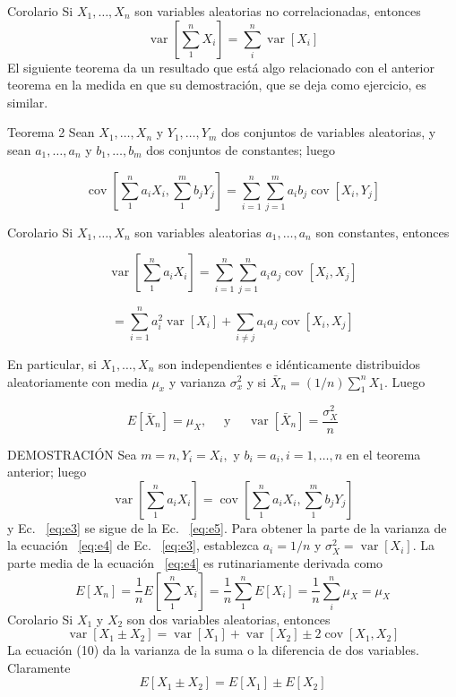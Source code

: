 Corolario Si $X_{1}, \ldots, X_{n}$ son variables aleatorias no correlacionadas, entonces
$$
\operatorname{var}\left[\sum_{1}^{n} X_{i}\right]=\sum_{i}^{n} \operatorname{var}\left[X_{i}\right]
$$
El siguiente teorema da un resultado que está algo relacionado con el anterior teorema en la medida en que su demostración, que se deja como ejercicio, es similar.

Teorema 2 Sean $X_{1}, \ldots, X_{n}$ y $Y_{1}, \ldots, Y_{m}$ dos conjuntos de variables aleatorias, y sean $a_{1}, \ldots, a_{n}$ y $b_{1}, \ldots, b_{m}$ dos conjuntos de constantes; luego

\begin{equation}\label{eq:e5}
\operatorname{cov}\left[\sum_{1}^{n} a_{i} X_{i}, \sum_{1}^{m} b_{j} Y_{j}\right]=\sum_{i=1}^{n} \sum_{j=1}^{m} a_{i} b_{j} \operatorname{cov}\left[X_{i}, Y_{j}\right]
\end{equation}

Corolario Si $X_{1}, \ldots, X_{n}$ son variables aleatorias $a_{1}, \ldots, a_{n}$ son constantes, entonces

$$\operatorname{var}\left[\sum_{1}^{n} a_{i} X_{i}\right]= \sum_{i=1}^{n} \sum_{j=1}^{n} a_{i} a_{j} \operatorname{cov}\left[X_{i}, X_{j}\right]$$

\begin{equation}\label{eq:e3}
=\sum_{i=1}^{n} a_{i}^{2} \operatorname{var}\left[X_{i}\right]+\sum_{i \neq j} a_{i} a_{j} \operatorname{cov}\left[X_{i}, X_{j}\right]
\end{equation}

En particular, si $X_{1}, \ldots, X_{n}$ son independientes e idénticamente distribuidos aleatoriamente con media $\mu_{x}$ y varianza $\sigma_{x}^{2}$ y si $\bar{X}_{n}=(1 / n) \sum_{1}^{n} X_{1}$. Luego

\begin{equation}\label{eq:e4}
E\left[\bar{X}_{n}\right]=\mu_{X}, \quad \text { y } \quad \operatorname{var}\left[\bar{X}_{n}\right]=\frac{\sigma_{X}^{2}}{n}
\end{equation}

DEMOSTRACIÓN Sea $m=n, Y_{i}=X_{i},$ y $b_{i}=a_{i}, i=1, \ldots, n$ en el teorema anterior; luego
$$
\operatorname{var}\left[\sum_{1}^{n} a_{i} X_{i}\right]=\operatorname{cov}\left[\sum_{1}^{n} a_{i} X_{i}, \sum_{1}^{m} b_{j} Y_{j}\right]
$$
y Ec. ~\ref{eq:e3} se sigue de la Ec. ~\ref{eq:e5}. Para obtener la parte de la varianza de la ecuación ~\ref{eq:e4} de Ec. ~\ref{eq:e3}, establezca $a_{i}=1 / n$ y $\sigma_{X}^{2}=\operatorname{var}\left[X_{i}\right] .$ La parte media de la ecuación ~\ref{eq:e4} es rutinariamente derivada como
$$
E\left[X_{n}\right]=\frac{1}{n} E\left[\sum_{1}^{n} X_{i}\right]=\frac{1}{n} \sum_{1}^{n} E\left[X_{i}\right]=\frac{1}{n} \sum_{i}^{n} \mu_{X}=\mu_{X}
$$
Corolario Si $X_{1}$ y $X_{2}$ son dos variables aleatorias, entonces
$$
\operatorname{var}\left[X_{1} \pm X_{2}\right]=\operatorname{var}\left[X_{1}\right]+\operatorname{var}\left[X_{2}\right] \pm 2 \operatorname{cov}\left[X_{1}, X_{2}\right]
$$
La ecuación (10) da la varianza de la suma o la diferencia de dos variables. Claramente
$$
E\left[X_{1} \pm X_{2}\right]=E\left[X_{1}\right] \pm E\left[X_{2}\right]
$$


